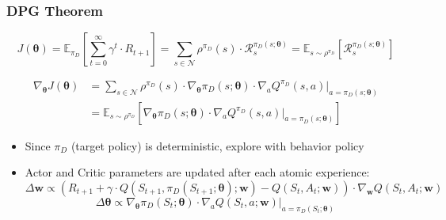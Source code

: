 \documentclass[handout]{beamer}
\begin{document}
\begin{frame}
\frametitle{DPG Theorem}
\pause
$$J(\bm{\theta}) = \mathbb{E}_{\pi_D}[\sum_{t=0}^\infty \gamma^t \cdot R_{t+1}] = \sum_{s \in \mathcal{N}} \rho^{\pi_D}(s) \cdot \mathcal{R}_s^{\pi_D(s;\bm{\theta})} = \mathbb{E}_{s \sim \rho^{\pi_D}}[\mathcal{R}_s^{\pi_D(s;\bm{\theta})}]$$
\pause
\begin{theorem}
\begin{align*}
\nabla_{\bm{\theta}} J(\bm{\theta}) & = \sum_{s \in \mathcal{N}} \rho^{\pi_D}(s) \cdot \nabla_{\bm{\theta}} \pi_D(s; \bm{\theta}) \cdot \nabla_a Q^{\pi_D}(s,a) \Bigr\rvert_{a=\pi_D(s;\bm{\theta})}\\
& = \mathbb{E}_{s \sim \rho^{\pi_D}}[\nabla_{\bm{\theta}} \pi_D(s; \bm{\theta}) \cdot \nabla_a Q^{\pi_D}(s,a) \Bigr\rvert_{a=\pi_D(s;\bm{\theta})}]
\end{align*}
\end{theorem}
\pause
\begin{itemize}[<+->]
\item Since $\pi_D$ (target policy) is deterministic, explore with behavior policy
\item Actor and Critic parameters are updated after each atomic experience:
$$\Delta \bm{w} \propto (R_{t+1} + \gamma \cdot Q(S_{t+1}, \pi_D(S_{t+1}; \bm{\theta}); \bm{w}) - Q(S_t,A_t;\bm{w})) \cdot \nabla_{\bm{w}} Q(S_t,A_t; \bm{w})$$
$$\Delta \bm{\theta} \propto \nabla_{\bm{\theta}} \pi_D(S_t; \bm{\theta}) \cdot \nabla_a Q(S_t,a;\bm{w}) \Bigr\rvert_{a=\pi_D(S_t;\bm{\theta})}$$
\end{itemize}
\end{frame}
\end{document}
